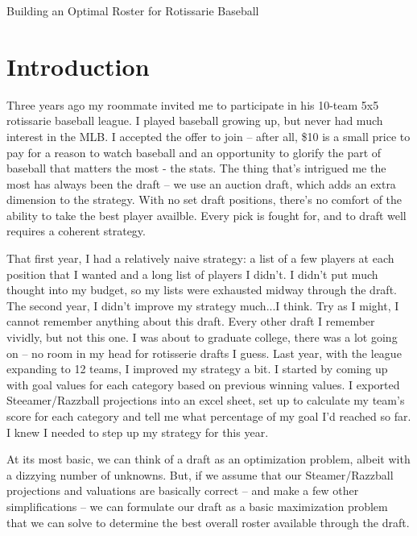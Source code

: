 \documentclass{article}
\begin{document}
\begin{Large}
\begin{center}
Building an Optimal Roster for Rotissarie Baseball
\end{center}

\end{Large}

\section*{Introduction}
Three years ago my roommate invited me to participate in his 10-team 5x5 rotissarie baseball league. I played baseball growing up, but never had much interest in the MLB. I accepted the offer to join -- after all, \$10 is a small price to pay for a reason to watch baseball and an opportunity to glorify the part of baseball that matters the most - the stats. The thing that's intrigued me the most has always been the draft -- we use an auction draft, which adds an extra dimension to the strategy. With no set draft positions, there's no comfort of the ability to take the best player availble. Every pick is fought for, and to draft well requires a coherent strategy. 

That first year, I had a relatively naive strategy: a list of a few players at each position that I wanted and a long list of players I didn't. I didn't put much thought into my budget, so my lists were exhausted midway through the draft. The second year, I didn't improve my strategy much...I think. Try as I might, I cannot remember anything about this draft. Every other draft I remember vividly, but not this one. I was about to graduate college, there was a lot going on -- no room in my head for rotisserie drafts I guess. Last year, with the league expanding to 12 teams, I improved my strategy a bit. I started by coming up with goal values for each category based on previous winning values. I exported Steeamer/Razzball projections into an excel sheet, set up to calculate my team's score for each category and tell me what percentage of my goal I'd reached so far. I knew I needed to step up my strategy for this year.

At its most basic, we can think of a draft as an optimization problem, albeit with a dizzying number of unknowns. But, if we assume that our Steamer/Razzball projections and valuations are basically correct -- and make a few other simplifications -- we can formulate our draft as a basic maximization problem that we can solve to determine the best overall roster available through the draft. 
\end{document}
